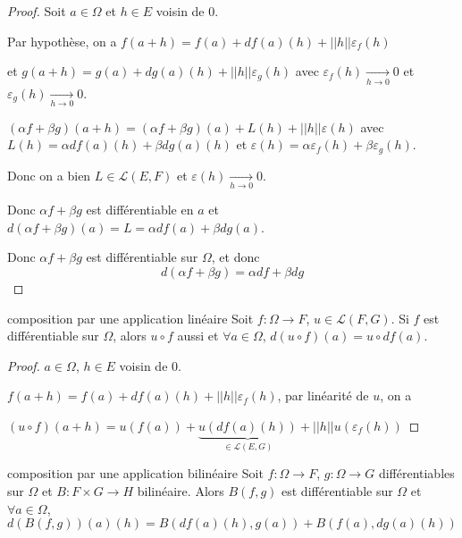 \begin{proof}
    Soit $a \in \Omega$ et $h \in E$ voisin de $0$.

    Par hypothèse, on a $f(a + h) = f(a) + df(a)(h) + ||h|| \varepsilon_f(h)$

    et $g(a + h) = g(a) + dg(a)(h) + ||h|| \varepsilon_g(h)$ 
    avec $\varepsilon_f(h) \xrightarrow[h \to 0 ]{} 0$ et $\varepsilon_g(h) \xrightarrow[h \to 0 ]{} 0$.

    $(\alpha f + \beta g)(a + h) = (\alpha f + \beta g)(a) + L(h) + ||h|| \varepsilon (h)$ avec 
    $L(h) = \alpha df(a)(h) + \beta dg(a)(h)$ et $\varepsilon (h) = \alpha \varepsilon_f(h) + \beta \varepsilon_g(h)$.

    Donc on a bien $L \in \mathscr L(E, F)$ et $\varepsilon(h) \xrightarrow[h \to 0 ]{} 0$.

    Donc $\alpha f + \beta g$ est différentiable en $a$ et $d(\alpha f + \beta g)(a) = L = \alpha df(a) + \beta dg(a)$.

    Donc $\alpha f + \beta g$ est différentiable sur $\Omega$, et donc 
    $$d(\alpha f + \beta g) = \alpha df + \beta dg$$
\end{proof}

\begin{proposition}{composition par une application linéaire}{}
    Soit $f : \Omega \to F$, $u \in \mathscr L(F, G)$. Si 
    $f$ est différentiable sur $\Omega$, alors $u \circ f$ aussi et 
    $\forall a \in \Omega$, $d(u \circ f)(a) = u \circ df(a)$.
\end{proposition}

\begin{proof}
    $a \in \Omega$, $h \in E$ voisin de $0$.

    $f(a + h) = f(a) + df(a)(h) + ||h|| \varepsilon_f(h)$, par linéarité de $u$, on a

    $(u \circ f)(a + h) = u(f(a)) + \underbrace{u(df(a)(h))}_{\in \mathscr L(E, G)} + ||h|| u(\varepsilon_f(h))$
\end{proof}

\begin{proposition}{composition par une application bilinéaire}{}
    Soit $f : \Omega \to F$, $g : \Omega \to G$ différentiables sur $\Omega$ et 
    $B : F \times G \to H$ bilinéaire. Alors $B(f, g)$ est différentiable sur $\Omega$ et 
    $\forall a \in \Omega$,
    $$d(B(f, g))(a)(h) = B(df(a)(h), g(a)) + B(f(a), dg(a)(h))$$
\end{proposition}


